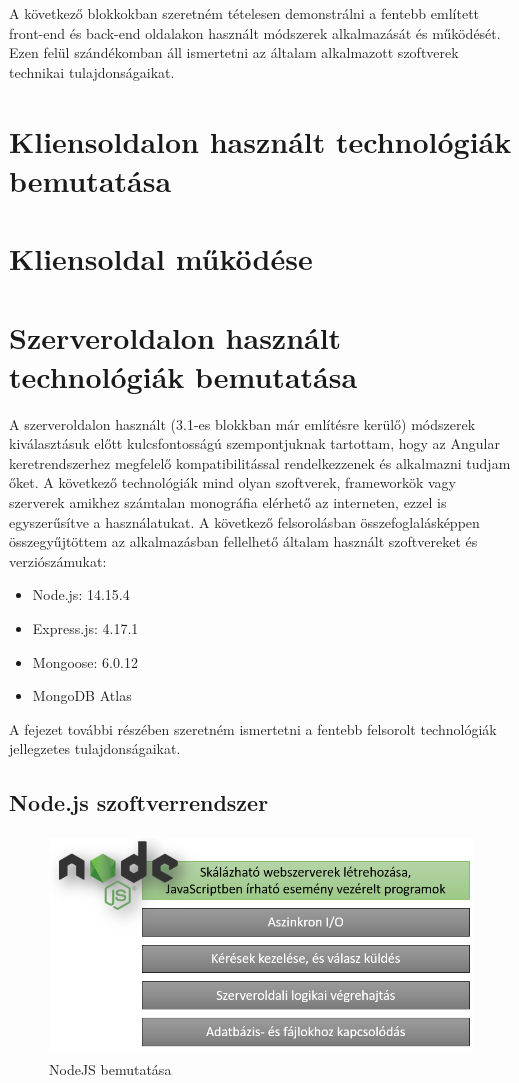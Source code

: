 \bigskip
A következő blokkokban szeretném tételesen demonstrálni a fentebb említett front-end és back-end oldalakon használt módszerek alkalmazását és működését. Ezen felül szándékomban áll ismertetni az általam alkalmazott szoftverek technikai tulajdonságaikat.
\section{Kliensoldalon használt technológiák bemutatása}

\section{Kliensoldal működése}

\section{Szerveroldalon használt technológiák bemutatása}
A szerveroldalon használt (3.1-es blokkban már említésre kerülő) módszerek kiválasztásuk előtt kulcsfontosságú szempontjuknak tartottam, hogy az Angular keretrendszerhez megfelelő kompatibilitással rendelkezzenek és alkalmazni tudjam őket. A következő technológiák mind olyan szoftverek, frameworkök vagy szerverek amikhez számtalan monográfia elérhető az interneten, ezzel is egyszerűsítve a használatukat. A következő felsorolásban összefoglalásképpen összegyűjtöttem az alkalmazásban fellelhető általam használt szoftvereket és verziószámukat:

\begin{itemize}
	\item Node.js: 14.15.4
	\item Express.js: 4.17.1
	\item Mongoose: 6.0.12
	\item MongoDB Atlas
\end{itemize}

\bigskip
A fejezet további részében szeretném ismertetni a fentebb felsorolt technológiák jellegzetes tulajdonságaikat.

\subsection{Node.js szoftverrendszer}

\begin{figure}[H]
	\centering
	\includegraphics[width=1.0\textwidth,height=220px]{images/nodejs_bemutatasa.png}
	\caption{NodeJS bemutatása}
	\label{fig.picture-3}
\end{figure}

